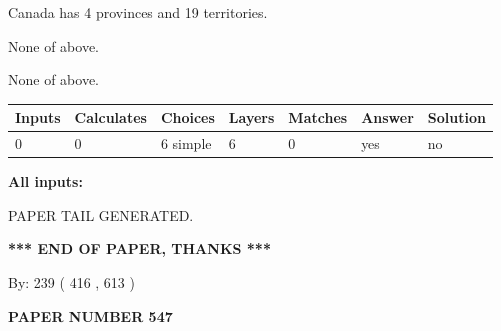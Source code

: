 \documentclass[12pt]{article}
\begin{document}
 
Canada has   4 provinces and  19 territories.
 
 
 None of above.
 
 
\noindent{}
 
 
 None of above.
 
 
\noindent{}
 
 
   
   
   
   
\noindent\begin{tabular}{|l|l|l|l|l|l|l|}
 \hline
Inputs & Calculates & Choices & Layers & Matches & Answer & Solution \\ \hline
 0  & 
 0  & 
 6
  simple  
  & 
 6  & 
 0  & 
  yes & 
  no 
  \\ \hline
 \end{tabular}
   
   
   
   
\noindent{}
   
   
   
   
\noindent\vspace{0.1in}\hspace{-0.08in} {\textbf{\Large{All inputs: }}}
   
   
   
   
   
   
 \vspace{0.2in}
 
   
   
\vspace{2.0in} PAPER TAIL GENERATED.
   
   
   
   
\vspace{1.0in} 
{\textbf{\large{ *** END OF PAPER, THANKS *** }}} 
   
   
\hspace{1.0in} By: 
 239 ( 416 ,  613 )
   
   
   
   
\newpage 
\setcounter{page}{ 
   547001 } 
   
   
   
   
 {\textbf{ \Large{ PAPER NUMBER  547  }}}
   
\end{document}
